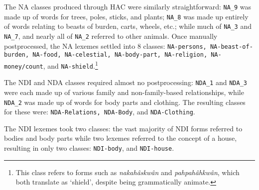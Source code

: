 The NA classes produced through HAC were similarly straightforward: \texttt{NA_9} was made up of words for trees, poles, sticks, and plants; \texttt{NA_8} was made up entirely of words relating to beasts of burden, carts, wheels, etc.; while much of \texttt{NA_3} and \texttt{NA_7}, and nearly all of \texttt{NA_2} referred to other animals. Once manually postprocessed, the NA lexemes settled into 8 classes: \texttt{NA-persons, NA-beast-of-burden, NA-food, NA-celestial, NA-body-part, NA-religion, NA-money/count}, and \texttt{NA-shield}.\footnote{This class refers to forms such as \textit{nakahâskwân} and \textit{pahpahâhkwân}, which both translate as ‘shield’, despite being grammatically animate.} 

The NDI and NDA classes required almost no postprocessing: \texttt{NDA_1} and \texttt{NDA_3} were each made up of various family and non-family-based relationships, while \texttt{NDA_2} was made up of words for body parts and clothing. The resulting classes for these were: \texttt{NDA-Relations, NDA-Body}, and \texttt{NDA-Clothing}.

The NDI lexemes took two classes: the vast majority of NDI forms referred to bodies and body parts while two lexemes referred to the concept of a house, resulting in only two classes: \texttt{NDI-body}, and \texttt{NDI-house}.

